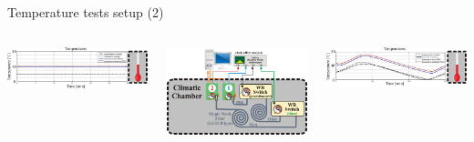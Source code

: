\documentclass[compress,red]{beamer}
\begin{document}
\begin{frame}{Temperature tests setup (2)}

\vspace{-1cm}
  \begin{columns}[c]
		\hspace{-1cm}
		\begin{center}
		\includegraphics[width=1.0\textwidth]{measurements/temp-profile-1.pdf}
		\end{center}
\vspace{-0.5cm}
		\begin{center}
		\includegraphics[width=1.0\textwidth]{measurements/tempTests-1-setup.pdf}
		\end{center}
		\hspace{-1cm}
		\begin{center}
		\includegraphics[width=1.0\textwidth]{measurements/temp-profile-2.pdf}

\end{center}
\end{columns}
\end{frame}
\end{document}

